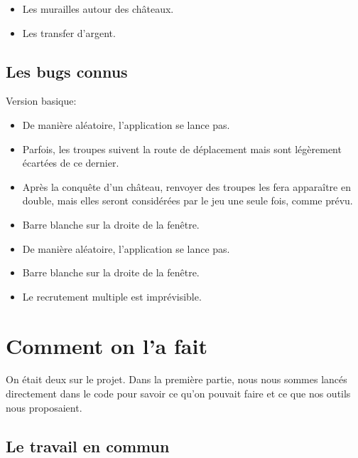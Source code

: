 \documentclass[12pt, a4paper]{report}
\begin{document}

\begin{itemize}
    \item Les murailles autour des châteaux.
    \item Les transfer d'argent.
\end{itemize}

\subsection*{Les bugs connus}

Version basique:

\begin{itemize}
    \item De manière aléatoire, l'application se lance pas.
    \item Parfois, les troupes suivent la route de déplacement mais sont légèrement écartées de ce dernier.
    \item Après la conquête d'un château, renvoyer des troupes les fera apparaître en double, mais elles seront considérées par le jeu une seule fois, comme prévu.
    \item Barre blanche sur la droite de la fenêtre.
\end{itemize}


\begin{itemize}
    \item De manière aléatoire, l'application se lance pas.
    \item Barre blanche sur la droite de la fenêtre.
    \item Le recrutement multiple est imprévisible.
\end{itemize}

\section*{Comment on l'a fait}

On était deux sur le projet. Dans la première partie, nous nous sommes lancés directement dans le code pour savoir ce qu'on pouvait faire et ce que nos outils nous proposaient.

\subsection*{Le travail en commun}
\end{document}
